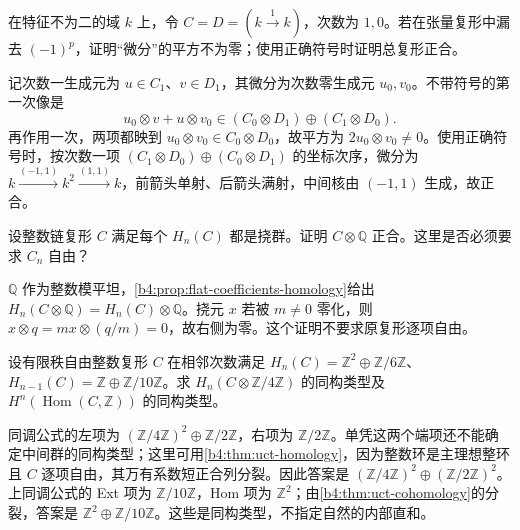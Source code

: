 \begin{exercise}\label{b4:ex:09-tensor-sign}
	在特征不为二的域 \(k\) 上，令 \(C=D=(k\xrightarrow{1}k)\)，次数为 \(1,0\)。若在张量复形中漏去 \((-1)^p\)，证明“微分”的平方不为零；使用正确符号时证明总复形正合。
\end{exercise}
\begin{solution}
	记次数一生成元为 \(u\in C_1\)、\(v\in D_1\)，其微分为次数零生成元 \(u_0,v_0\)。不带符号的第一次像是
	\[
		u_0\otimes v+u\otimes v_0 \in(C_0\otimes D_1)\oplus(C_1\otimes D_0).
	\]
	再作用一次，两项都映到 \(u_0\otimes v_0\in C_0\otimes D_0\)，故平方为 \(2u_0\otimes v_0\ne0\)。使用正确符号时，按次数一项 \((C_1\otimes D_0)\oplus(C_0\otimes D_1)\) 的坐标次序，微分为 \(k\xrightarrow{(-1,1)}k^2\xrightarrow{(1,1)}k\)，前箭头单射、后箭头满射，中间核由 \((-1,1)\) 生成，故正合。
\end{solution}

\begin{exercise}\label{b4:ex:09-rational-coefficients}
	设整数链复形 \(C\) 满足每个 \(H_n(C)\) 都是挠群。证明 \(C\otimes\mathbb Q\) 正合。这里是否必须要求 \(C_n\) 自由？
\end{exercise}
\begin{solution}
	\(\mathbb Q\) 作为整数模平坦，\cref{b4:prop:flat-coefficients-homology}给出 \(H_n(C\otimes\mathbb Q)=H_n(C)\otimes\mathbb Q\)。挠元 \(x\) 若被 \(m\ne0\) 零化，则 \(x\otimes q=mx\otimes(q/m)=0\)，故右侧为零。这个证明不要求原复形逐项自由。
\end{solution}

\begin{exercise}\label{b4:ex:09-uct-free-and-torsion}
	设有限秩自由整数复形 \(C\) 在相邻次数满足 \(H_n(C)=\mathbb Z^2\oplus\mathbb Z/6\mathbb Z\)、\(H_{n-1}(C)=\mathbb Z\oplus\mathbb Z/10\mathbb Z\)。求 \(H_n(C\otimes\mathbb Z/4\mathbb Z)\) 的同构类型及 \(H^n(\operatorname{Hom}(C,\mathbb Z))\) 的同构类型。
\end{exercise}
\begin{solution}
	同调公式的左项为 \((\mathbb Z/4\mathbb Z)^2\oplus\mathbb Z/2\mathbb Z\)，右项为 \(\mathbb Z/2\mathbb Z\)。单凭这两个端项还不能确定中间群的同构类型；这里可用\cref{b4:thm:uct-homology}，因为整数环是主理想整环且 \(C\) 逐项自由，其万有系数短正合列分裂。因此答案是 \((\mathbb Z/4\mathbb Z)^2\oplus(\mathbb Z/2\mathbb Z)^2\)。上同调公式的 Ext 项为 \(\mathbb Z/10\mathbb Z\)，Hom 项为 \(\mathbb Z^2\)；由\cref{b4:thm:uct-cohomology}的分裂，答案是 \(\mathbb Z^2\oplus\mathbb Z/10\mathbb Z\)。这些是同构类型，不指定自然的内部直和。
\end{solution}

